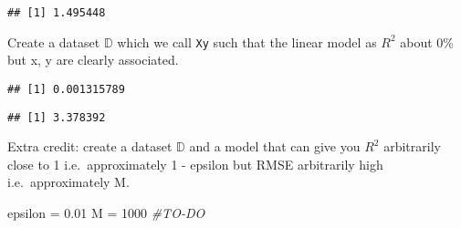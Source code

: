 \documentclass[
]{article}
\newenvironment{Shaded}{\begin{snugshade}}{\end{snugshade}}
\newcommand{\AttributeTok}[1]{\textcolor[rgb]{0.77,0.63,0.00}{#1}}
\newcommand{\CommentTok}[1]{\textcolor[rgb]{0.56,0.35,0.01}{\textit{#1}}}
\newcommand{\DecValTok}[1]{\textcolor[rgb]{0.00,0.00,0.81}{#1}}
\newcommand{\FloatTok}[1]{\textcolor[rgb]{0.00,0.00,0.81}{#1}}
\newcommand{\FunctionTok}[1]{\textcolor[rgb]{0.00,0.00,0.00}{#1}}
\newcommand{\NormalTok}[1]{#1}
\newcommand{\OtherTok}[1]{\textcolor[rgb]{0.56,0.35,0.01}{#1}}
\newcommand{\SpecialCharTok}[1]{\textcolor[rgb]{0.00,0.00,0.00}{#1}}
\begin{document}
\begin{verbatim}
## [1] 1.495448
\end{verbatim}

Create a dataset \(\mathbb{D}\) which we call \texttt{Xy} such that the
linear model as \(R^2\) about 0\% but x, y are clearly associated.

\begin{Shaded}
\end{Shaded}

\begin{verbatim}
## [1] 0.001315789
\end{verbatim}

\begin{Shaded}
\end{Shaded}

\begin{verbatim}
## [1] 3.378392
\end{verbatim}

Extra credit: create a dataset \(\mathbb{D}\) and a model that can give
you \(R^2\) arbitrarily close to 1 i.e.~approximately 1 - epsilon but
RMSE arbitrarily high i.e.~approximately M.

\begin{Shaded}
\begin{Highlighting}[]
\NormalTok{epsilon }\OtherTok{=} \FloatTok{0.01}
\NormalTok{M }\OtherTok{=} \DecValTok{1000}
\CommentTok{\#TO{-}DO}
\end{Highlighting}
\end{Shaded}
\end{document}
